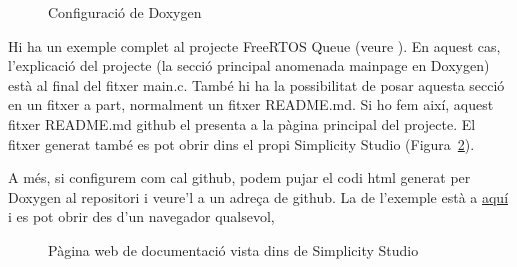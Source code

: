 \begin{figure}
 \centering
 \caption{Configuració de Doxygen}
 \label{fig:doxygenconfig}
\end{figure}

Hi ha un exemple complet al projecte FreeRTOS Queue (veure ). En aquest cas, l'explicació del projecte (la secció principal anomenada mainpage en Doxygen) està al final del fitxer main.c. També hi ha la possibilitat de posar aquesta secció en un fitxer a part, normalment un fitxer README.md. Si ho fem així, aquest fitxer README.md github el presenta a la pàgina principal del projecte. El fitxer generat també es pot obrir dins el propi Simplicity Studio (Figura~\ref{fig:doxygeneclipse}).

A més, si configurem com cal github, podem pujar el codi html generat per Doxygen al repositori i veure'l a un adreça de github. La de l'exemple està a \href{https://mariusmm.github.io/cursembedded/Simplicity/FreeRTOS_1/Doc/html/}{aquí} \cite{GITHUBPages} i es pot obrir des d'un navegador qualsevol,

\begin{figure}
 \centering
 \caption{Pàgina web de documentació vista dins de Simplicity Studio}
 \label{fig:doxygeneclipse}
\end{figure}

